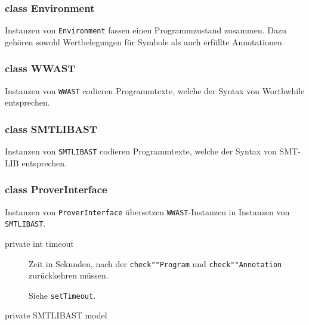 \subsubsection{class Environment}%

Instanzen von \texttt{Environment} fassen einen Programmzustand
zusammen. Dazu gehören sowohl Wertbelegungen für Symbole als auch
erfüllte Annotationen.%

\subsubsection{class WWAST}%

Instanzen von \texttt{WWAST} codieren Programmtexte, welche der Syntax
von Worthwhile entsprechen.%

\subsubsection{class SMTLIBAST}%

Instanzen von \texttt{SMTLIBAST} codieren Programmtexte, welche der
Syntax von SMT-LIB entsprechen.%

\subsubsection{class ProverInterface}%

Instanzen von \texttt{ProverInterface} übersetzen
\texttt{WWAST}-Instanzen in Instanzen von \texttt{SMTLIBAST}.%


\begin{description}%
    \item [private int timeout]

    Zeit in Sekunden, nach der \texttt{check""Program} und
    \texttt{check""Annotation} zurückkehren müssen.%

    Siehe \texttt{setTimeout}.%

    \item [private SMTLIBAST model]%

\end{description}%


